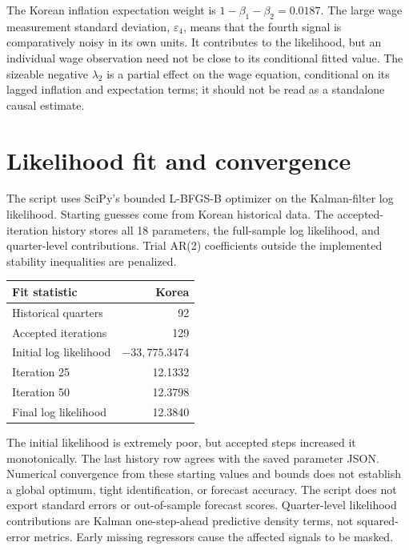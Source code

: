 \documentclass[11pt,a4paper]{article}
\newcommand{\eps}{\varepsilon}
\begin{document}
The Korean inflation expectation weight is $1-\beta_1-\beta_2=0.0187$.
The large wage measurement standard deviation, $\eps_4$, means that the
fourth signal is comparatively noisy in its own units. It contributes to the
likelihood, but an individual wage observation need not be close to its
conditional fitted value. The sizeable negative $\lambda_2$ is a partial
effect on the wage equation, conditional on its lagged inflation and
expectation terms; it should not be read as a standalone causal estimate.

\section{Likelihood fit and convergence}
The script uses SciPy's bounded L-BFGS-B optimizer on the Kalman-filter log
likelihood. Starting guesses come from Korean historical data. The
accepted-iteration history stores all 18 parameters, the full-sample log
likelihood, and quarter-level contributions. Trial AR(2) coefficients
outside the implemented stability inequalities are penalized.

\begin{center}
\begin{tabular}{@{}lr@{}}
\toprule
Fit statistic & Korea\\
\midrule
Historical quarters & 92\\
Accepted iterations & 129\\
Initial log likelihood & $-33{,}775.3474$\\
Iteration 25 & 12.1332\\
Iteration 50 & 12.3798\\
Final log likelihood & 12.3840\\
\bottomrule
\end{tabular}
\end{center}

The initial likelihood is extremely poor, but accepted steps increased it
monotonically. The last history row agrees with the saved parameter JSON.
Numerical convergence from these starting values and bounds does not
establish a global optimum, tight identification, or forecast accuracy. The
script does not export standard errors or out-of-sample forecast scores.
Quarter-level likelihood contributions are Kalman one-step-ahead predictive
density terms, not squared-error metrics. Early missing regressors cause the
affected signals to be masked.
\end{document}
